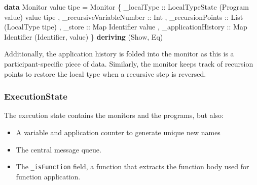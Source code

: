 \documentclass[runningheads]{llncs}
\providecommand{\tightlist}{%
  \setlength{\itemsep}{0pt}\setlength{\parskip}{0pt}}
\newenvironment{Shaded}{}{}
\newcommand{\KeywordTok}[1]{\textcolor[rgb]{0.00,0.44,0.13}{\textbf{#1}}}
\newcommand{\DataTypeTok}[1]{\textcolor[rgb]{0.56,0.13,0.00}{#1}}
\newcommand{\OtherTok}[1]{\textcolor[rgb]{0.00,0.44,0.13}{#1}}
\newcommand{\FunctionTok}[1]{\textcolor[rgb]{0.02,0.16,0.49}{#1}}
\newcommand{\NormalTok}[1]{#1}
\begin{document}
\begin{Shaded}
\begin{Highlighting}[]
\KeywordTok{data} \DataTypeTok{Monitor}\NormalTok{ value tipe }\FunctionTok{=} 
    \DataTypeTok{Monitor} 
\NormalTok{        \{}\OtherTok{ _localType ::} \DataTypeTok{LocalTypeState}\NormalTok{ (}\DataTypeTok{Program}\NormalTok{ value) value tipe}
\NormalTok{        ,}\OtherTok{ _recursiveVariableNumber ::} \DataTypeTok{Int}
\NormalTok{        ,}\OtherTok{ _recursionPoints ::} \DataTypeTok{List}\NormalTok{ (}\DataTypeTok{LocalType}\NormalTok{ tipe)}
\NormalTok{        ,}\OtherTok{ _store ::} \DataTypeTok{Map} \DataTypeTok{Identifier}\NormalTok{ value }
\NormalTok{        ,}\OtherTok{ _applicationHistory ::} \DataTypeTok{Map} \DataTypeTok{Identifier}\NormalTok{ (}\DataTypeTok{Identifier}\NormalTok{, value)}
\NormalTok{        \}}
        \KeywordTok{deriving}\NormalTok{ (}\DataTypeTok{Show}\NormalTok{, }\DataTypeTok{Eq}\NormalTok{)}
\end{Highlighting}
\end{Shaded}

Additionally, the application history is folded into the monitor as this
is a participant-specific piece of data. Similarly, the monitor keeps
track of recursion points to restore the local type when a recursive
step is reversed.

\subsubsection{ExecutionState}\label{executionstate}

The execution state contains the monitors and the programs, but also:
\begin{itemize}
\tightlist
\item
  A variable and application counter to generate unique new names
\item
  The central message queue.
\item
  The \texttt{\_isFunction} field, a function that extracts the function
  body used for function application.
\end{itemize}
\end{document}
